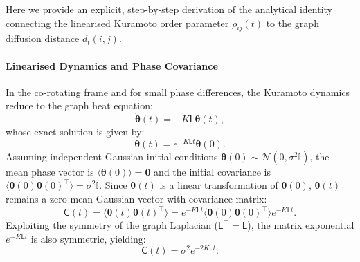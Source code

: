 \documentclass[twocolumn,aps,prl,superscriptaddress,nofootinbib]{revtex4-2}
\theoremstyle{plain}
\theoremstyle{definition}
\newcommand{\Lap}{\mathsf{L}}
\newcommand{\Cov}{\mathsf{C}}
\begin{document}
Here we provide an explicit, step-by-step derivation of the analytical identity connecting the linearised Kuramoto order parameter $\rho_{ij}(t)$ to the graph diffusion distance $d_t(i,j)$.

\paragraph{Linearised Dynamics and Phase Covariance}
In the co-rotating frame and for small phase differences, the Kuramoto dynamics reduce to the graph heat equation:
\begin{equation}
\dot{\bm\theta}(t) = -K \Lap \bm\theta(t),
\end{equation}
whose exact solution is given by:
\begin{equation}
\bm\theta(t) = e^{-K \Lap t} \bm\theta(0).
\end{equation}
Assuming independent Gaussian initial conditions $\bm\theta(0) \sim \mathcal{N}(0, \sigma^2 \mathbb{I})$, the mean phase vector is $\langle \bm\theta(0) \rangle = \bm 0$ and the initial covariance is $\langle \bm\theta(0) \bm\theta(0)^\top \rangle = \sigma^2 \mathbb{I}$. Since $\bm\theta(t)$ is a linear transformation of $\bm\theta(0)$, $\bm\theta(t)$ remains a zero-mean Gaussian vector with covariance matrix:
\begin{equation}
\Cov(t) = \langle \bm\theta(t) \bm\theta(t)^\top \rangle = e^{-K \Lap t} \langle \bm\theta(0) \bm\theta(0)^\top \rangle e^{-K \Lap t}.
\end{equation}
Exploiting the symmetry of the graph Laplacian ($\Lap^\top = \Lap$), the matrix exponential $e^{-K \Lap t}$ is also symmetric, yielding:
\begin{equation}
\Cov(t) = \sigma^2 e^{-2K \Lap t}.
\end{equation}
\end{document}
